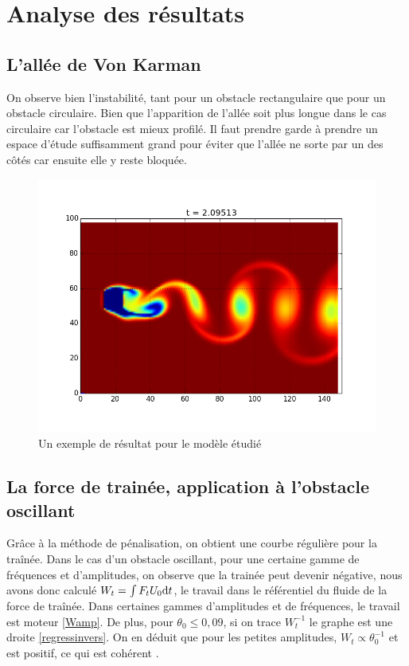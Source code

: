 \section{Analyse des résultats}

	\subsection{L'allée de Von Karman}
	
		On observe bien l'instabilité, tant pour un obstacle rectangulaire que pour un obstacle circulaire. Bien que l'apparition de l'allée soit plus longue dans le cas circulaire car l'obstacle est mieux profilé. Il faut prendre garde à prendre un espace d'étude suffisamment grand pour éviter que l'allée ne sorte par un des côtés car ensuite elle y reste bloquée.
		
		\begin{figure}[htbp]\begin{center}
			\includegraphics[width=0.8 \textwidth]{VK_pas_mal.png}
			\caption{Un exemple de résultat pour le modèle étudié}
			\label{VK}
		\end{center}\end{figure}	
		
	
	\subsection{La force de trainée, application à l'obstacle oscillant}
	
		Grâce à la méthode de pénalisation, on obtient une courbe
        régulière pour la traînée. Dans le cas d'un obstacle
        oscillant, pour une certaine gamme de fréquences et
        d'amplitudes, on observe que la trainée peut devenir négative,
        nous avons donc calculé $W_t= \int F_t U_0\mathrm{d}t$, le travail
        dans le référentiel du fluide de la force de traînée. Dans
        certaines gammes d'amplitudes et de fréquences, le travail est
        moteur \ref{Wamp}. De plus, pour $ \theta_0 \leq 0,09$, si on
        trace $W_t^{-1}$ le graphe est une droite
        \ref{regressinvers}. On en déduit que pour les petites
        amplitudes, $W_t \propto \theta_0^{-1}$ et est positif, ce qui
        est cohérent . 
		
